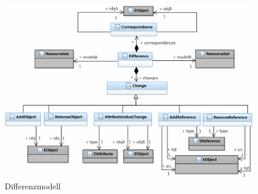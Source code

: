 \begin{figure}[htb]
  \centering
  \includegraphics[width=1.0\textwidth]{images/difference_model.png}
  \caption{Differenzmodell}
  \label{fig:diffmodel}
\end{figure}